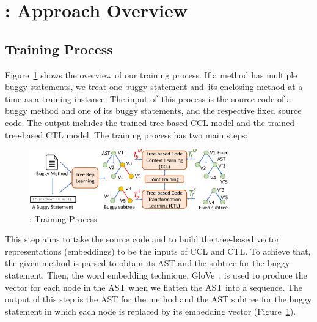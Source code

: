 \section{{\tool}: Approach Overview}
\label{overview:sec}



\subsection{Training Process}

Figure~\ref{overview-training} shows the overview of our training
process. If a method has multiple buggy statements, we treat one buggy
statement and~its enclosing method at a time as a training
instance. The input of~this process is the source code of a buggy
method and one of its buggy statements, and the respective fixed
source code.  The output includes the trained tree-based CCL model and
the trained tree-based CTL model.
%
The training process has two main steps:

\begin{figure}[t]
	\centering
	\includegraphics[width=3.4in]{graphs/new_overview-2.png}
        \vspace{-15pt}
	\caption{{\tool}: Training Process}
	\label{overview-training}
\end{figure}

 This step aims to
take the source code and to build the tree-based vector
representations (embeddings) to be the inputs of CCL and CTL. To
achieve that, the given method is parsed to obtain its AST
and the subtree for the buggy statement.
Then, the word embedding technique, GloVe~\cite{pennington2014glove},
is used to produce the vector for each node in the AST when we flatten
the AST into a sequence. The output of this step is the AST for the
method and the AST subtree for the buggy statement
in which each node is replaced by its embedding vector
(Figure~\ref{overview-training}).

